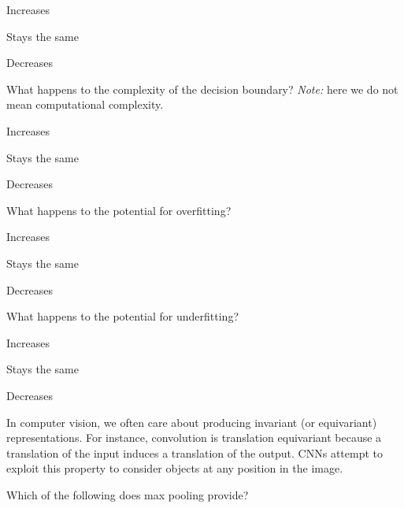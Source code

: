 \documentclass{csci1430}
\begin{document}
\begin{answerlist}
    \item Increases
    \item Stays the same
    \item Decreases
\end{answerlist}

\pagebreak
    
\begin{subquestion}[points=1]
What happens to the complexity of the decision boundary? \emph{Note:} here we do not mean computational complexity.
\end{subquestion}

\begin{answerlist}
    \item Increases
    \item Stays the same
    \item Decreases
\end{answerlist}

\begin{subquestion}[points=1]
What happens to the potential for overfitting?
\end{subquestion}
    
\begin{answerlist}
    \item Increases
    \item Stays the same
    \item Decreases
\end{answerlist}

\begin{subquestion}[points=1]
What happens to the potential for underfitting?
\end{subquestion}

\begin{answerlist}
    \item Increases
    \item Stays the same
    \item Decreases
\end{answerlist}


\pagebreak
In computer vision, we often care about producing invariant (or equivariant) representations. For instance, convolution is translation equivariant because a translation of the input induces a translation of the output. CNNs attempt to exploit this property to consider objects at any position in the image.

\begin{subquestion}[points=3]
Which of the following does max pooling provide?
\end{subquestion}
\end{document}
